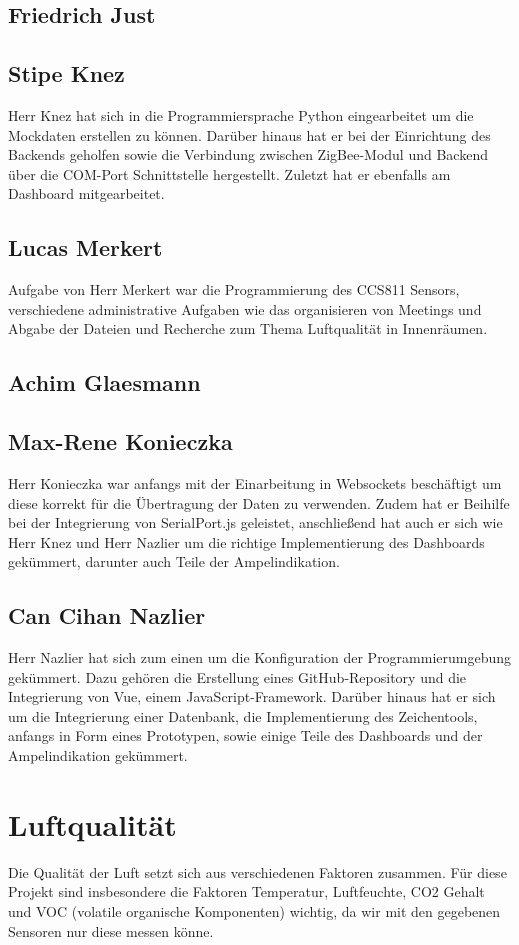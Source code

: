 \documentclass[]{article}
\begin{document}
		\subsection{Friedrich Just}
		\subsection{Stipe Knez}
			Herr Knez hat sich in die Programmiersprache Python eingearbeitet um die Mockdaten erstellen zu können. Darüber hinaus hat er bei der Einrichtung des Backends geholfen sowie die Verbindung zwischen ZigBee-Modul und Backend über die COM-Port Schnittstelle hergestellt. Zuletzt hat er ebenfalls am Dashboard mitgearbeitet. 
		\subsection{Lucas Merkert}
			Aufgabe von Herr Merkert war die Programmierung des CCS811 Sensors, verschiedene administrative Aufgaben wie das organisieren von Meetings und Abgabe der Dateien und Recherche zum Thema Luftqualität in Innenräumen.
		\subsection{Achim Glaesmann}
		\subsection{Max-Rene Konieczka}
			Herr Konieczka war anfangs mit der Einarbeitung in Websockets beschäftigt um diese korrekt für die Übertragung der Daten zu verwenden. Zudem hat er Beihilfe bei der Integrierung von SerialPort.js geleistet, anschließend hat auch er sich wie Herr Knez und Herr Nazlier um die richtige Implementierung des Dashboards gekümmert, darunter auch Teile der Ampelindikation. 
		\subsection{Can Cihan Nazlier}
			Herr Nazlier hat sich zum einen um die Konfiguration der Programmierumgebung gekümmert. Dazu gehören die Erstellung eines GitHub-Repository und die Integrierung von Vue, einem JavaScript-Framework. Darüber hinaus hat er sich um die Integrierung einer Datenbank, die Implementierung des Zeichentools, anfangs in Form eines Prototypen, sowie einige Teile des Dashboards und der Ampelindikation gekümmert.
		
	\section{Luftqualität}%
		Die Qualität der Luft setzt sich aus verschiedenen Faktoren zusammen. Für diese Projekt sind insbesondere die Faktoren Temperatur, Luftfeuchte, CO2 Gehalt und VOC (volatile organische Komponenten) wichtig, da wir mit den gegebenen Sensoren nur diese messen könne.
\end{document}
